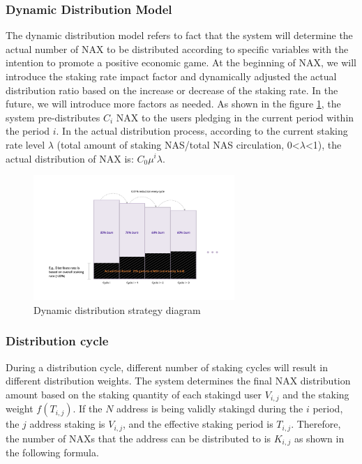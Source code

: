 \subsubsection{Dynamic Distribution Model}
The dynamic distribution model refers to fact that the system will determine the actual number of NAX to be distributed according to specific variables with the intention to promote a positive economic game. At the beginning of NAX, we will introduce the staking rate impact factor and dynamically adjusted the actual distribution ratio based on the increase or decrease of the staking rate. In the future, we will introduce more  factors as needed. As shown in the figure \ref{fig:dynamic_dist}, the system pre-distributes $C_i$ NAX to the users pledging in the current period within the period $i$. In the actual distribution process, according to the current staking rate level $\lambda$ (total amount of staking NAS/total NAS circulation, 0<$\lambda$<1), the actual distribution of NAX is: $C_0 \mu ^i\lambda$.

\begin{figure}[htbp]
  \centering
  \includegraphics[width=0.68\textwidth]{../common/dynamic_dist.pdf}
  \caption{Dynamic distribution strategy diagram\label{fig:dynamic_dist}}
\end{figure}

\subsubsection{Distribution cycle}
During a distribution cycle, different number of staking cycles will result in different distribution weights. The system determines the final NAX distribution amount based on the staking quantity of each stakingd user $V_{i, j}$ and the staking weight \(f(T_{i, j})\). If the $N$ address is being validly stakingd during the $i$ period, the $j$ address staking is $V_{i,j}$, and the effective staking period is $T_{i,j}$. Therefore, the number of NAXs that the address can be distributed to is $K_{i,j}$ as shown in the following formula.

